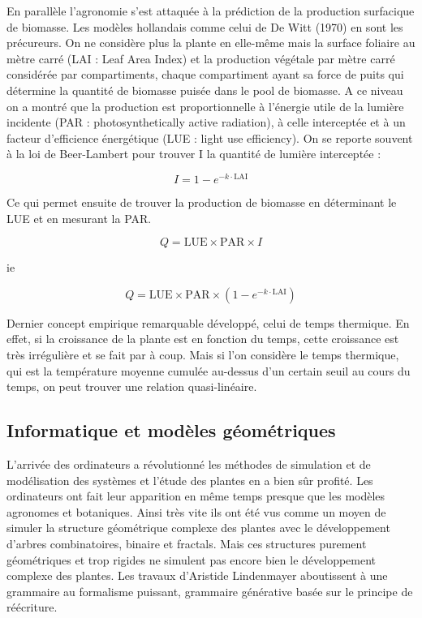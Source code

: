 En parallèle l’agronomie s’est attaquée à la prédiction de la production surfacique de biomasse. Les modèles hollandais comme celui de De Witt (1970) en sont les précureurs. On ne considère plus la plante en elle-même mais la surface foliaire au mètre carré (LAI : Leaf Area Index) et la production végétale par mètre carré considérée par compartiments, chaque compartiment ayant sa force de puits qui détermine la quantité de biomasse puisée dans le pool de biomasse. A ce niveau on a montré que la production est proportionnelle à l’énergie utile de la lumière incidente (PAR : photosynthetically active radiation), à celle interceptée et à un facteur d’efficience énergétique (LUE : light use efficiency). On se reporte souvent à la loi de Beer-Lambert pour trouver I la quantité de lumière interceptée : 

\[ I = 1-e^{-k\cdot\mathrm{LAI}} \]

Ce qui permet ensuite de trouver la production de biomasse en déterminant le LUE et en mesurant la PAR.

\[ Q = \mathrm{LUE}\times\mathrm{PAR}\times I \]

ie

\[ Q = \mathrm{LUE}\times\mathrm{PAR}\times(1-e^{-k\cdot\mathrm{LAI}}) \]

Dernier concept empirique remarquable développé, celui de temps thermique. En effet, si la croissance de la plante est en fonction du temps, cette croissance est très irrégulière et se fait par à coup. Mais si l’on considère le temps thermique, qui est la température moyenne cumulée au-dessus d’un certain seuil au cours du temps, on peut trouver une relation quasi-linéaire.

\subsection{Informatique et modèles géométriques}

L’arrivée des ordinateurs a révolutionné les méthodes de simulation et de modélisation des systèmes et l’étude des plantes en a bien sûr profité.
Les ordinateurs ont fait leur apparition en même temps presque que les modèles agronomes et botaniques. Ainsi très vite ils ont été vus comme un moyen de simuler la structure géométrique complexe des plantes avec le développement d’arbres combinatoires, binaire et fractals. Mais ces structures purement géométriques et trop rigides ne simulent pas encore bien le développement complexe des plantes.
Les travaux d’Aristide Lindenmayer aboutissent à une grammaire au formalisme puissant, grammaire générative basée sur le principe de réécriture. \cite{prusinkiewicz2012algorithmic}


